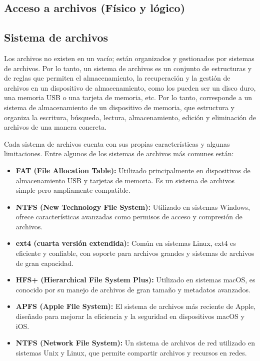 \documentclass[11pt, twocolumn]{article}
\begin{document}
  \subsection{Acceso a archivos (Físico y lógico)}
  \lipsum[8-9]

  \subsection{Sistema de archivos}
  Los archivos no existen en un vacío; están organizados y gestionados por sistemas de archivos. Por lo tanto, un sistema de archivos es un conjunto de estructuras y de reglas que permiten el almacenamiento, la recuperación y la gestión de archivos en un dispositivo de almacenamiento, como los pueden ser un disco duro, una memoria USB o una tarjeta de memoria, etc. Por lo tanto, corresponde a un sistema de almacenamiento de un dispositivo de memoria, que estructura y organiza la escritura, búsqueda, lectura, almacenamiento, edición y eliminación de archivos de una manera concreta.

  Cada sistema de archivos cuenta con sus propias características y algunas limitaciones. Entre algunos de los sistemas de archivos más comunes están:

  \begin{itemize}
    \item \textbf{FAT (File Allocation Table):} Utilizado principalmente en dispositivos de almacenamiento USB y tarjetas de memoria. Es un sistema de archivos simple pero ampliamente compatible.
    \item \textbf{NTFS (New Technology File System):} Utilizado en sistemas Windows, ofrece características avanzadas como permisos de acceso y compresión de archivos.
    \item \textbf{ext4 (cuarta versión extendida):} Común en sistemas Linux, ext4 es eficiente y confiable, con soporte para archivos grandes y sistemas de archivos de gran capacidad.
    \item	\textbf{HFS+ (Hierarchical File System Plus):} Utilizado en sistemas macOS, es conocido por su manejo de archivos de gran tamaño y metadatos avanzados.
    \item \textbf{APFS (Apple File System):} El sistema de archivos más reciente de Apple, diseñado para mejorar la eficiencia y la seguridad en dispositivos macOS y iOS.
    \item \textbf{NTFS (Network File System):} Un sistema de archivos de red utilizado en sistemas Unix y Linux, que permite compartir archivos y recursos en redes.
  \end{itemize}
  
\end{document}
